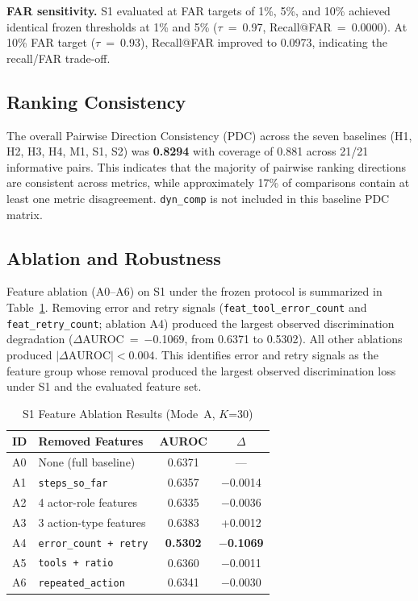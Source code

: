\documentclass[conference]{IEEEtran}
\begin{document}
\textbf{FAR sensitivity.} S1 evaluated at FAR targets of 1\%, 5\%, and
10\% achieved identical frozen thresholds at 1\% and 5\% ($\tau$~=~0.97,
Recall@FAR~=~0.0000). At 10\% FAR target ($\tau$~=~0.93),
Recall@FAR improved to 0.0973, indicating the recall/FAR trade-off.

\subsection{Ranking Consistency}

The overall Pairwise Direction Consistency (PDC) across the seven
baselines (H1, H2, H3, H4, M1, S1, S2) was \textbf{0.8294} with
coverage of 0.881 across 21/21 informative pairs. This indicates that
the majority of pairwise ranking directions are consistent across
metrics, while approximately 17\% of comparisons contain at least one
metric disagreement. \texttt{dyn\_comp} is not included in this baseline
PDC matrix.

\subsection{Ablation and Robustness}

Feature ablation (A0--A6) on S1 under the frozen protocol is summarized
in Table~\ref{tab:ablation}. Removing error and retry signals
(\texttt{feat\_tool\_error\_count} and \texttt{feat\_retry\_count};
ablation A4) produced the largest observed discrimination degradation
($\Delta$AUROC~=~$-$0.1069, from 0.6371 to 0.5302). All other
ablations produced $|\Delta\mathrm{AUROC}| < 0.004$. This identifies
error and retry signals as the feature group whose removal produced
the largest observed discrimination loss under S1 and the evaluated
feature set.

\begin{table}[t]
\centering
\caption{S1 Feature Ablation Results (Mode~A, $K$=30)}
\label{tab:ablation}
\begin{tabular}{@{}llcc@{}}
\toprule
ID & Removed Features & AUROC & $\Delta$ \\
\midrule
A0 & None (full baseline) & 0.6371 & --- \\
A1 & \texttt{steps\_so\_far} & 0.6357 & $-$0.0014 \\
A2 & 4 actor-role features & 0.6335 & $-$0.0036 \\
A3 & 3 action-type features & 0.6383 & +0.0012 \\
A4 & \texttt{error\_count + retry} & \textbf{0.5302} & $-$\textbf{0.1069} \\
A5 & \texttt{tools + ratio} & 0.6360 & $-$0.0011 \\
A6 & \texttt{repeated\_action} & 0.6341 & $-$0.0030 \\
\bottomrule
\end{tabular}
\end{table}
\end{document}

